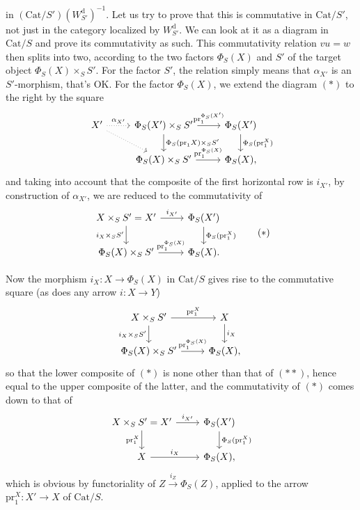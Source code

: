 \documentclass[11pt]{article}
\newcommand{\printedpage}[1]{\marginpar{\footnotesize p.~#1}}
\newcommand{\msp}[1]{\marginpar{\footnotesize [#1]}}
\newcommand{\Cat}{\mathrm{Cat}}
\newcommand{\pr}{\mathrm{pr}}
\newcommand{\dd}{\mathrm{d}}
\begin{document}
\printedpage{89}

in $(\Cat/S')(W^{\dd}_{S'})^{-1}$. Let us try to prove that this is commutative in $\Cat/S'$, not just in the category localized by $W^{\dd}_{S'}$. We can look at it as a diagram in $\Cat/S$ and prove its commutativity as such. This commutativity relation $vu = w$ then splits into two, according to the two factors $\Phi_S(X)$ and $S'$ of the target object $\Phi_S(X) \times_S S'$. For the factor $S'$, the relation simply means that $\alpha_{X'}$ is an $S'$-morphism, that's OK. For the factor $\Phi_S(X)$, we extend the diagram $(*)$ to the right by the square
\[
\begin{tikzcd}
X' \arrow[r, dotted, "\alpha_{X'}"] \arrow[dr, dotted] & \Phi_S(X') \times_S S' \arrow[r, "\pr_1^{\Phi_S(X')}"] \arrow[d, "\Phi_S(\pr_1 X)\times_S S'"] & \Phi_S(X') \arrow[d, "\Phi_S(\pr_1^X)"] \\
 & \Phi_S(X) \times_S S' \arrow[r, "\pr_1^{\Phi_S(X)}"] & \Phi_S(X),
\end{tikzcd}
\] %
\msp{page 146}
and taking into account that the composite of the first horizontal row is $i_{X'}$, by construction of $\alpha_{X'}$, we are reduced to the commutativity of
\[
\begin{tikzcd}
X \times_S S' = X' \arrow[r, "i_{X'}"] \arrow[d, "i_X\times_S S'"'] & \Phi_S(X') \arrow[d, "\Phi_S(\pr_1^X)"] \\
\Phi_S(X) \times_S S' \arrow[r, "\pr_1^{\Phi_S(X)}"] & \Phi_S(X).
\end{tikzcd}
\tag*{$(*)$}
\]

Now the morphism $i_X : X \longrightarrow \Phi_S(X)$ in $\Cat/S$ gives rise to the commutative square (as does any arrow $i : X \longrightarrow Y$)
\[
\begin{tikzcd}
X \times_S S' \arrow[r, "\pr_1^X"] \arrow[d, "i_X\times_S S'"'] & X \arrow[d, "i_X"] \\
\Phi_S(X) \times_S S' \arrow[r, "\pr_1^{\Phi_S(X)}"] & \Phi_S(X),
\end{tikzcd}
\]
so that the lower composite of $(*)$ is none other than that of $(**)$, hence equal to the upper composite of the latter, and the commutativity of $(*)$ comes down to that of
\[
\begin{tikzcd}
X \times_S S' = X' \arrow[r, "i_{X'}"] \arrow[d, "\pr_1^X"'] & \Phi_S(X') \arrow[d, "\Phi_S(\pr_1^X)"] \\
X \arrow[r, "i_X"] & \Phi_S(X),
\end{tikzcd}
\]
which is obvious by functoriality of $Z \xrightarrow{i_Z} \Phi_S(Z)$, applied to the arrow $\pr_1^X : X' \longrightarrow X$ of $\Cat/S$.
\end{document}
